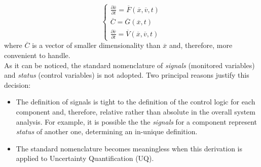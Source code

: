 \begin{equation}
\label{eq:controlVars}
\left\{\begin{matrix}
\frac{\partial \overline{x} }{\partial t} = \overline{F}\left (  \overline{x}, \overline{v}, t \right )  \\
 \overline{C} =  \overline{G}(\overline{x},t)     \\
\frac{\partial \overline{v} }{\partial t} = \overline{V}\left (  \overline{x}, \overline{v}, t \right )
\end{matrix}\right.
\end{equation}
where $\overline{C}$ is a vector of smaller dimensionality than $\overline{x}$ and,
therefore, more convenient to handle.
\\As it can be noticed, the standard nomenclature of \textit{signals} (monitored variables) and \textit{status} (control variables) is not adopted. Two principal reasons
justify this decision:
\begin{itemize}
  \item The definition of signals is tight to the definition of the
  control logic for each component and, therefore, relative rather than absolute in the
  overall system analysis. For example, it is possible the the \textit{signals} for a
  component represent \textit{status} of another one, determining an in-unique
  definition.
  \item The standard nomenclature becomes meaningless when this derivation is
  applied to Uncertainty Quantification (UQ).
\end{itemize}

